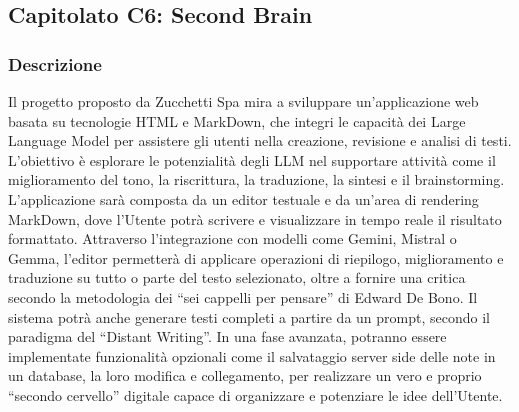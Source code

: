 \documentclass[a4paper,12pt]{article}
\begin{document}
\subsection{Capitolato C6: Second Brain}

\subsubsection{Descrizione}
Il progetto proposto da Zucchetti Spa mira a sviluppare un’applicazione web basata su tecnologie HTML e MarkDown, che integri le capacità dei Large Language Model per assistere gli utenti nella creazione, revisione e analisi di testi. L’obiettivo è esplorare le potenzialità degli LLM nel supportare attività come il miglioramento del tono, la riscrittura, la traduzione, la sintesi e il brainstorming.  
L’applicazione sarà composta da un editor testuale e da un’area di rendering MarkDown, dove l’Utente potrà scrivere e visualizzare in tempo reale il risultato formattato. Attraverso l’integrazione con modelli come Gemini, Mistral o Gemma, l’editor permetterà di applicare operazioni di riepilogo, miglioramento e traduzione su tutto o parte del testo selezionato, oltre a fornire una critica secondo la metodologia dei “sei cappelli per pensare” di Edward De Bono.  
Il sistema potrà anche generare testi completi a partire da un prompt, secondo il paradigma del “Distant Writing”. In una fase avanzata, potranno essere implementate funzionalità opzionali come il salvataggio server side delle note in un database, la loro modifica e collegamento, per realizzare un vero e proprio “secondo cervello” digitale capace di organizzare e potenziare le idee dell’Utente.
\end{document}
